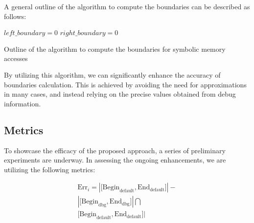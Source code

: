 \documentclass[conference]{IEEEtran}
\begin{document}
A general outline of the algorithm to compute the boundaries can be described as follows:

\begin{algorithm}
    $left\_boundary = 0$\;
    $right\_boundary = 0$\;

    \caption{Outline of the algorithm to compute the boundaries for symbolic memory accesses}
\end{algorithm}

By utilizing this algorithm, we can significantly enhance the accuracy of boundaries calculation. This is achieved by avoiding the need for approximations in many cases, and instead relying on the precise values obtained from debug information.

\subsection{Metrics}

To showcase the efficacy of the proposed approach, a series of preliminary experiments are underway. In assessing the ongoing enhancements, we are utilizing the following metrics:

\begin{equation}
    \begin{aligned}
        \text{Err}_i= | \lbrack \text{Begin}_\text{default}, \text{End}_\text{default} \rbrack | - \\
        {|\lbrack \text{Begin}_\text{dbg}, \text{End}_\text{dbg}\rbrack|} \bigcap                  \\
        {\lbrack \text{Begin}_\text{default}, \text{End}_\text{default} \rbrack|}
    \end{aligned}
\end{equation}
\end{document}
